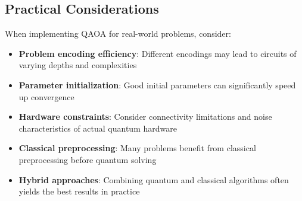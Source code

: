 \vspace{0.3cm}

\subsection*{Practical Considerations}

When implementing QAOA for real-world problems, consider:

\begin{itemize}
  \item \textbf{Problem encoding efficiency}: Different encodings may lead to
    circuits of varying depths and complexities

  \item \textbf{Parameter initialization}: Good initial parameters can
    significantly speed up convergence

  \item \textbf{Hardware constraints}: Consider connectivity limitations and
    noise characteristics of actual quantum hardware

  \item \textbf{Classical preprocessing}: Many problems benefit from
    classical preprocessing before quantum solving

  \item \textbf{Hybrid approaches}: Combining quantum and classical
    algorithms often yields the best results in practice
\end{itemize}


